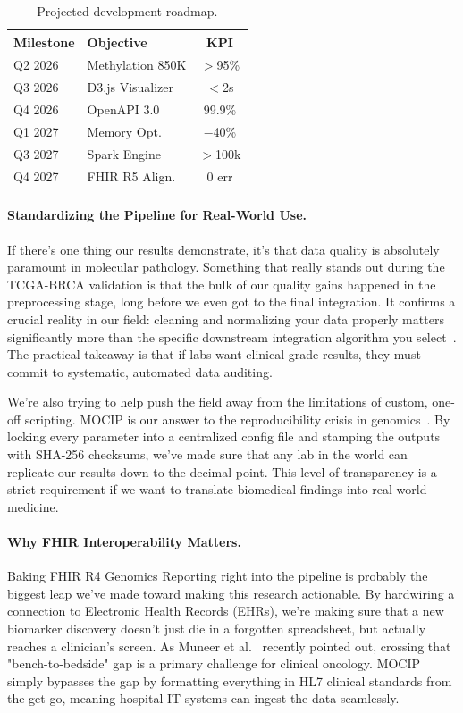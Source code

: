 \documentclass[12pt,a4paper,onecolumn]{article}
\begin{document}
\begin{table}[H]
\caption{Projected development roadmap.}\label{tab:roadmap}
\centering
\small
\setlength{\tabcolsep}{3pt}
\begin{tabular}{l l c}
\toprule
\textbf{Milestone} & \textbf{Objective} & \textbf{KPI} \\
\midrule
Q2 2026 & Methylation 850K & $>$95\% \\
Q3 2026 & D3.js Visualizer & $<$2s \\
Q4 2026 & OpenAPI 3.0 & 99.9\% \\
Q1 2027 & Memory Opt. & $-$40\% \\
Q3 2027 & Spark Engine & $>$100k \\
Q4 2027 & FHIR R5 Align. & 0 err \\
\bottomrule
\end{tabular}
\end{table}

\paragraph{Standardizing the Pipeline for Real-World Use.}
If there's one thing our results demonstrate, it's that data quality is absolutely paramount in molecular pathology. Something that really stands out during the TCGA-BRCA validation is that the bulk of our quality gains happened in the preprocessing stage, long before we even got to the final integration. It confirms a crucial reality in our field: cleaning and normalizing your data properly matters significantly more than the specific downstream integration algorithm you select~\cite{krassowski2020}. The practical takeaway is that if labs want clinical-grade results, they must commit to systematic, automated data auditing.

We're also trying to help push the field away from the limitations of custom, one-off scripting. MOCIP is our answer to the reproducibility crisis in genomics~\cite{wilkinson2016}. By locking every parameter into a centralized config file and stamping the outputs with SHA-256 checksums, we've made sure that any lab in the world can replicate our results down to the decimal point. This level of transparency is a strict requirement if we want to translate biomedical findings into real-world medicine.

\paragraph{Why FHIR Interoperability Matters.}
Baking FHIR R4 Genomics Reporting right into the pipeline is probably the biggest leap we've made toward making this research actionable. By hardwiring a connection to Electronic Health Records (EHRs), we're making sure that a new biomarker discovery doesn't just die in a forgotten spreadsheet, but actually reaches a clinician's screen. As Muneer et al.~\cite{muneer2025review} recently pointed out, crossing that "bench-to-bedside" gap is a primary challenge for clinical oncology. MOCIP simply bypasses the gap by formatting everything in HL7 clinical standards from the get-go, meaning hospital IT systems can ingest the data seamlessly.
\end{document}
